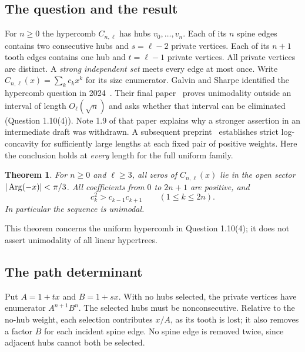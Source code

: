 \documentclass[11pt,a4paper]{article}
\newtheorem{SourceRcbTtheorem}{Theorem}
\begin{document}
\subsection{The question and the result}
For $n\ge0$ the hypercomb $C_{n,\ell}$ has hubs $v_0,\ldots,v_n$.
Each of its $n$ spine edges contains two consecutive hubs and $s=\ell-2$
private vertices. Each of its $n+1$ tooth edges contains one hub and
$t=\ell-1$ private vertices. All private vertices are distinct. A
\emph{strong independent set} meets every edge at most once. Write
$C_{n,\ell}(x)=\sum_k c_k x^k$ for its size enumerator.
Galvin and Sharpe identified the hypercomb question in 2024~\cite{R21T:vone}.
Their final paper~\cite{R21T:gs} proves unimodality outside an interval of
length $O_\ell(\sqrt n)$ and asks whether that interval can be
eliminated (Question 1.10(4)). Note 1.9 of that paper explains why a
stronger assertion in an intermediate draft was withdrawn. A subsequent
preprint~\cite{R21T:eventual} establishes strict log-concavity for sufficiently
large lengths at each fixed pair of positive weights. Here the conclusion
holds at \emph{every} length for the full uniform family.
\begin{SourceRcbTtheorem}\label{R21T:main}
For $n\ge0$ and $\ell\ge3$, all zeros of $C_{n,\ell}(x)$ lie in the
open sector $|\operatorname{Arg}(-x)|<\pi/3$. All coefficients from $0$ to $2n+1$
are positive, and
\[
 c_k^2>c_{k-1}c_{k+1}\qquad(1\le k\le 2n).
\]
In particular the sequence is unimodal.
\end{SourceRcbTtheorem}
This theorem concerns the uniform hypercomb in Question 1.10(4); it does
not assert unimodality of all linear hypertrees.

\subsection{The path determinant}
Put $A=1+tx$ and $B=1+sx$. With no hubs selected, the private vertices
have enumerator $A^{n+1}B^n$. The selected hubs must be nonconsecutive.
Relative to the no-hub weight, each selection contributes $x/A$, as its
tooth is lost; it also removes a factor $B$ for each incident spine
edge. No spine edge is removed twice, since adjacent hubs cannot both
be selected.
\end{document}
